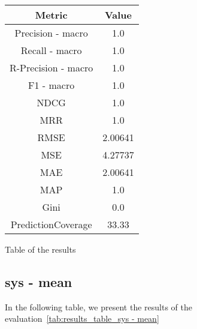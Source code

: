\documentclass[11pt]{article}
\begin{document}
\begin{center}
    \begin{tabular}{|c|c|}
        \hline
        \textbf{Metric} & \textbf{Value} \\ \hline
        Precision - macro & 1.0\\ \hline
                Recall - macro & 1.0\\ \hline
                R-Precision - macro & 1.0\\ \hline
                F1 - macro &  1.0\\ \hline
                NDCG  & 1.0\\ \hline
            MRR  & 1.0\\ \hline
            RMSE & 2.00641\\ \hline
            MSE & 4.27737\\ \hline
            MAE & 2.00641\\ \hline
            MAP  & 1.0\\ \hline
            Gini & 0.0\\ \hline
            PredictionCoverage & 33.33\\ \hline
         \end{tabular}
    \captionsetup{type=table}
    \caption{Table of the results}
    \label{tab:results_table_sys - fold2}
\end{center}
\hfill\break
\hfill\break



\subsection{sys - mean}\label{subsec:sys - mean}
In the following table, we present the results of the evaluation~\ref{tab:results_table_sys - mean}
\end{document}

